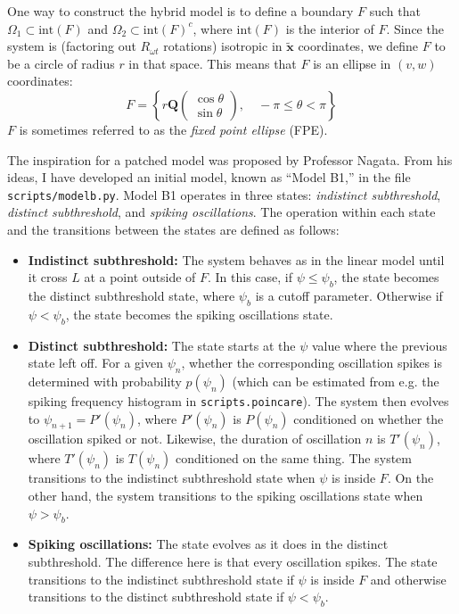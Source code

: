 \documentclass[letterpaper,12pt]{article}
\numberwithin{table}{section}
\numberwithin{figure}{section}
\numberwithin{equation}{section}
\newcommand*{\qvec}[2]{\begin{pmatrix} #1 \\ #2 \end{pmatrix}}
\begin{document}
\begin{flushleft}
    One way to construct the hybrid model is to define a boundary $F$ such that $\Omega_1 \subset \text{int}(F)$ and $\Omega_2 \subset \text{int}(F)^c$, where $\text{int}(F)$ is the interior of $F$. Since the system is (factoring out $R_{\omega t}$ rotations) isotropic in $\mathbf{\tilde{x}}$ coordinates, we define $F$ to be a circle of radius $r$ in that space. This means that $F$ is an ellipse in $(v, w)$ coordinates:
    \begin{equation}
        F = \left\{r\mathbf{Q}\qvec{\cos\theta}{\sin\theta}, \quad -\pi \leq \theta < \pi\right\}
    \end{equation}
    $F$ is sometimes referred to as the \textit{fixed point ellipse} (FPE).

    The inspiration for a patched model was proposed by Professor Nagata. From his ideas, I have developed an initial model, known as ``Model B1,'' in the file \texttt{scripts/modelb.py}. Model B1 operates in three states: \textit{indistinct subthreshold}, \textit{distinct subthreshold}, and \textit{spiking oscillations}. The operation within each state and the transitions between the states are defined as follows:
    \begin{itemize}
        \item \textbf{Indistinct subthreshold:} The system behaves as in the linear model until it cross $L$ at a point outside of $F$. In this case, if $\psi \leq \psi_b$, the state becomes the distinct subthreshold state, where $\psi_b$ is a cutoff parameter. Otherwise if $\psi < \psi_b$, the state becomes the spiking oscillations state.
        \item \textbf{Distinct subthreshold:} The state starts at the $\psi$ value where the previous state left off. For a given $\psi_n$, whether the corresponding oscillation spikes is determined with probability $p(\psi_n)$ (which can be estimated from e.g. the spiking frequency histogram in \texttt{scripts.poincare}). The system then evolves to $\psi_{n+1} = P'(\psi_n)$, where $P'(\psi_n)$ is $P(\psi_n)$ conditioned on whether the oscillation spiked or not. Likewise, the duration of oscillation $n$ is $T'(\psi_n)$, where $T'(\psi_n)$ is $T(\psi_n)$ conditioned on the same thing. The system transitions to the indistinct subthreshold state when $\psi$ is inside $F$. On the other hand, the system transitions to the spiking oscillations state when $\psi > \psi_b$.
        \item \textbf{Spiking oscillations:} The state evolves as it does in the distinct subthreshold. The difference here is that every oscillation spikes. The state transitions to the indistinct subthreshold state if $\psi$ is inside $F$ and otherwise transitions to the distinct subthreshold state if $\psi < \psi_b$.
    \end{itemize}


\end{flushleft}
\end{document}
